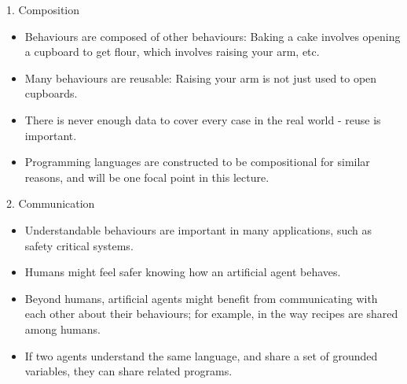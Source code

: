 
\begin{frame}{1. Composition}
\begin{itemize}
    \item Behaviours are composed of other behaviours: Baking a cake involves opening a cupboard to get flour, which involves raising your arm, etc.
    \item Many behaviours are reusable: Raising your arm is not just used to open cupboards.
    \item There is never enough data to cover every case in the real world - reuse is important.
    \item Programming languages are constructed to be compositional for similar reasons, and will be one focal point in this lecture.
\end{itemize}
\end{frame}


\begin{frame}{2. Communication}
\begin{itemize}
    \item Understandable behaviours are important in many applications, such as safety critical systems.
    \item Humans might feel safer knowing how an artificial agent behaves.
    \item Beyond humans, artificial agents might benefit from communicating with each other about their behaviours; for example, in the way recipes are shared among humans.
    \item If two agents understand the same language, and share a set of grounded variables, they can share related programs.
\end{itemize}
\end{frame}


